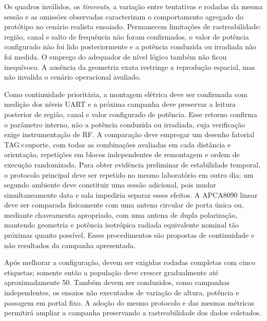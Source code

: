 Os quadros inválidos, os \textit{timeouts}, a variação entre tentativas e rodadas da mesma sessão e as omissões observadas caracterizam o comportamento agregado do protótipo no cenário realista ensaiado. Permanecem limitações de rastreabilidade: região, canal e salto de frequência não foram confirmados, o valor de potência configurado não foi lido posteriormente e a potência conduzida ou irradiada não foi medida. O emprego do adequador de nível lógico também não ficou inequívoco. A ausência da geometria exata restringe a reprodução espacial, mas não invalida o cenário operacional avaliado.

Como continuidade prioritária, a montagem elétrica deve ser confirmada com medição dos níveis UART e a próxima campanha deve preservar a leitura posterior de região, canal e valor configurado de potência. Esse retorno confirma o parâmetro interno, não a potência conduzida ou irradiada, cuja verificação exige instrumentação de RF. A comparação deve empregar um desenho fatorial TAG$\times$suporte, com todas as combinações avaliadas em cada distância e orientação, repetições em blocos independentes de remontagem e ordem de execução randomizada. Para obter evidência preliminar de estabilidade temporal, o protocolo principal deve ser repetido no mesmo laboratório em outro dia; um segundo ambiente deve constituir uma sessão adicional, pois mudar simultaneamente data e sala impediria separar esses efeitos. A APCA8090 linear deve ser comparada fisicamente com uma antena circular de porta única ou, mediante chaveamento apropriado, com uma antena de dupla polarização, mantendo geometria e potência isotrópica radiada equivalente nominal tão próximas quanto possível. Esses procedimentos são propostas de continuidade e não resultados da campanha apresentada.

Após melhorar a configuração, devem ser exigidas rodadas completas com cinco etiquetas; somente então a população deve crescer gradualmente até aproximadamente 50. Também devem ser conduzidos, como campanhas independentes, os ensaios não executados de variação de altura, potência e passagem em portal fixo. A adoção do mesmo protocolo e das mesmas métricas permitirá ampliar a campanha preservando a rastreabilidade dos dados coletados.
